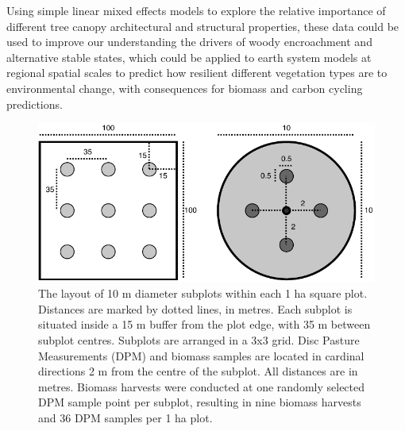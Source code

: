 \begin{refsection}
Using simple linear mixed effects models to explore the relative importance of different tree canopy architectural and structural properties, these data could be used to improve our understanding the drivers of woody encroachment and alternative stable states, which could be applied to earth system models at regional spatial scales to predict how resilient different vegetation types are to environmental change, with consequences for biomass and carbon cycling predictions.

\begin{figure}[H]
\centering
	\includegraphics[width=\textwidth]{img/subplot}
	\caption{The layout of 10 m diameter subplots within each 1 ha square plot. Distances are marked by dotted lines, in metres. Each subplot is situated inside a 15 m buffer from the plot edge, with 35 m between subplot centres. Subplots are arranged in a 3x3 grid. Disc Pasture Measurements (DPM) and biomass samples are located in cardinal directions 2 m from the centre of the subplot. All distances are in metres. Biomass harvests were conducted at one randomly selected DPM sample point per subplot, resulting in nine biomass harvests and 36 DPM samples per 1 ha plot.}
	\label{subplot}
\end{figure}



\newpage{}
\begingroup
{}
\printbibliography[heading=subbibintoc]
\endgroup

\end{refsection}

